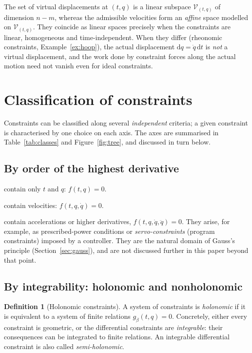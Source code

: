 \documentclass[11pt,a4paper]{article}
\theoremstyle{definition}
\newtheorem{definition}{Definition}[section]
\theoremstyle{plain}
\theoremstyle{remark}
\newcommand{\dd}{\mathrm{d}}
\begin{document}
The set of virtual displacements at $(t,q)$ is a linear subspace $\mathcal V_{(t,q)}$ of
dimension $n-m$, whereas the admissible velocities form an \emph{affine} space
modelled on $\mathcal V_{(t,q)}$. They coincide as linear spaces precisely when the
constraints are linear, homogeneous and time-independent. When they differ (rheonomic
constraints, Example~\ref{ex:hoop}), the actual displacement $\dd q=\dot q\,\dd t$ is
\emph{not} a virtual displacement, and the work done by constraint forces along the actual
motion need not vanish even for ideal constraints.

\section{Classification of constraints}\label{sec:classification}
Constraints can be classified along several \emph{independent} criteria; a given
constraint is characterised by one choice on each axis. The axes are summarised in
Table~\ref{tab:classes} and Figure~\ref{fig:tree}, and discussed in turn below.

\subsection{By order of the highest derivative}
\begin{description}[leftmargin=1.2em,style=nextline]
\item[Geometric (finite) constraints] contain only $t$ and $q$: $f(t,q)=0$.
\item[Kinematic (differential) constraints] contain velocities: $f(t,q,\dot q)=0$.
\item[Dynamic (higher-order) constraints] contain accelerations or higher derivatives,
  $f(t,q,\dot q,\ddot q)=0$. They arise, for example, as prescribed-power conditions or
  \emph{servo-constraints} (program constraints) imposed by a controller. They are the
  natural domain of Gauss's principle (Section~\ref{sec:gauss}), and are not discussed
  further in this paper beyond that point.
\end{description}

\subsection{By integrability: holonomic and nonholonomic}\label{sec:holo}
\begin{definition}[Holonomic constraints]
A system of constraints is \emph{holonomic} if it is equivalent to a system of finite
relations $g_\beta(t,q)=0$. Concretely, either every constraint is geometric, or the
differential constraints are \emph{integrable}: their consequences can be integrated to
finite relations. An integrable differential constraint is also called
\emph{semi-holonomic}.
\end{definition}
\end{document}

